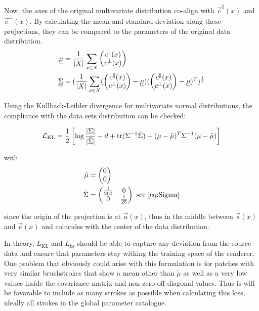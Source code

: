 Now, the axes of the original multivariate distribution co-align with $\vec{c}^\parallel(x)$ and $\vec{c}^\bot(x)$.
By calculating the mean and standard deviation along these projections, they can be compared to the parameters of the original data distribution.
\begin{align}
    \underline\mu & = \frac{1}{\vert X \vert}\sum_{x \in X} \begin{pmatrix} c^\parallel(x) \\ c^\bot(x) \end{pmatrix} \\
    \underline{\underline{\Sigma}} & = (\frac{1}{\vert X \vert} \sum_{x \in X}
        (\begin{pmatrix} c^\parallel(x) \\ c^\bot(x) \end{pmatrix} - \underline\mu)
        (\begin{pmatrix} c^\parallel(x) \\ c^\bot(x) \end{pmatrix} - \underline\mu)^T
        )^{\frac{1}{2}} \\
\end{align}

Using the Kullback-Leibler divergence for multivariate normal distributions, the compliance with the data sets distribution can be checked:

\begin{align}
    \mathcal{L}_{\text{KL}} = \frac{1}{2}\left[\log\frac{|\Sigma|}{|\tilde{\Sigma}|} - d + \text{tr} ( \Sigma^{-1}\tilde{\Sigma} ) + (\mu - \tilde{\mu})^T \Sigma^{-1}(\mu - \tilde{\mu})\right]
\end{align}

with 
\begin{align}
    \tilde{\mu} & = \begin{pmatrix} 0 \\ 0 \end{pmatrix} \\
    \tilde{\Sigma} & = \begin{pmatrix} \frac{1}{200} & 0 \\ 0 & \frac{1}{25} \end{pmatrix} \text{ see \eqref{eq:Sigma}}
\end{align}

since the origin of the projection is at $\vec{a}(x)$, thus in the middle between $\vec{s}(x)$ and $\vec{e}(x)$ and coincides with the center of the data distribution.

In theory, $L_{\text{KL}}$ and $L_{\text{bs}}$ should be able to capture any deviation from the source data and ensure that parameters stay withing the training space of the renderer.
One problem that obviously could arise with this formulation is for patches with very similar brushstrokes that show a mean other than $\tilde{\mu}$ as well as  a very low values inside the covariance matrix and non-zero off-diagonal values.
Thus is will be favorable to include as many strokes as possible when calculating this loss, ideally all strokes in the global parameter catalogue.

